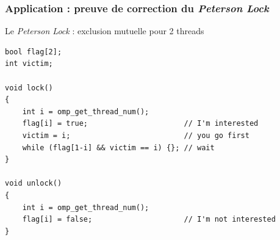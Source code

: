 \documentclass[xcolor={x11names,svgnames}]{beamer}
\begin{document}

\begin{frame}[fragile, label=peterson_code]
  \frametitle{Application : preuve de correction du \emph{Peterson Lock}}

  \begin{block}{Le \og \emph{Peterson Lock}\fg{} : exclusion mutuelle pour 2 threads}
\begin{verbatim}
bool flag[2];
int victim;

void lock() 
{
    int i = omp_get_thread_num();
    flag[i] = true;                      // I'm interested
    victim = i;                          // you go first
    while (flag[1-i] && victim == i) {}; // wait
}

void unlock() 
{
    int i = omp_get_thread_num();
    flag[i] = false;                     // I'm not interested
}
\end{verbatim}
  \end{block}
\end{frame}

\end{document}
